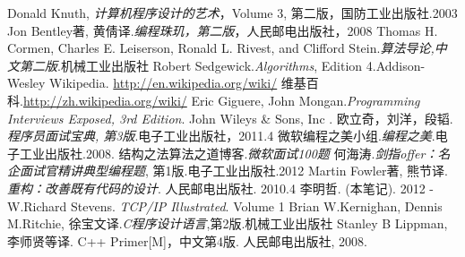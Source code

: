 

\begin{thebibliography}{99}

    Donald Knuth, \emph{计算机程序设计的艺术}，Volume 3, 第二版，国防工业出版社.2003
    Jon Bentley著, 黄倩译.\emph{编程珠玑，第二版}，人民邮电出版社，2008
    Thomas H. Cormen, Charles E. Leiserson, Ronald L. Rivest, and Clifford Stein.\emph{算法导论,中文第二版}.机械工业出版社
    Robert Sedgewick.\emph{Algorithms}, Edition 4.Addison-Wesley
    Wikipedia. \url{http://en.wikipedia.org/wiki/}
    维基百科.\url{http://zh.wikipedia.org/wiki/}
     Eric Giguere, John Mongan.\emph{Programming Interviews Exposed, 3rd Edition}. John Wileys \& Sons, Inc .
     欧立奇，刘洋，段韬.\emph{程序员面试宝典, 第3版}.电子工业出版社，2011.4 
     微软编程之美小组.\emph{编程之美}.电子工业出版社.2008.
    结构之法算法之道博客.\emph{微软面试100题}
    何海涛.\emph{剑指offer：名企面试官精讲典型编程题}, 第1版.电子工业出版社.2012
    Martin Fowler著, 熊节译. \emph{重构：改善既有代码的设计}. 人民邮电出版社. 2010.4
    李明哲. \emph{\bookname} (本笔记). 2012 - \number\year 
    W.Richard Stevens. \emph{TCP/IP Illustrated}. Volume 1
    Brian W.Kernighan, Dennis M.Ritchie, 徐宝文译.\emph{C程序设计语言},第2版.机械工业出版社
     Stanley B Lippman, 李师贤等译. C++ Primer[M]，中文第4版. 人民邮电出版社, 2008.

\end{thebibliography}






